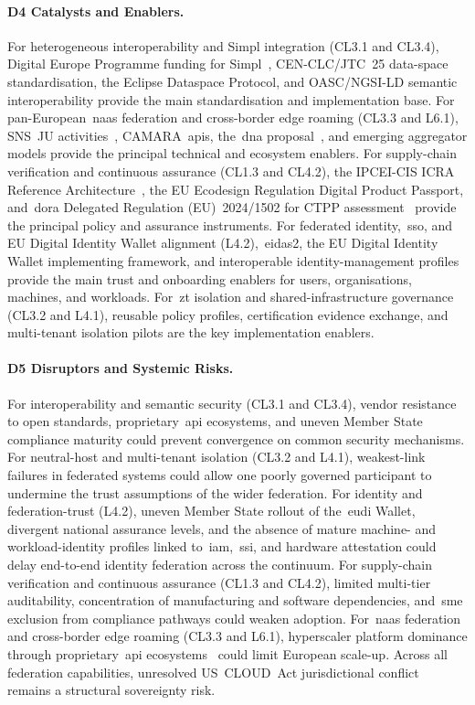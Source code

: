 \documentclass{ieeeaccess}
\begin{document}
\paragraph{D4 Catalysts and Enablers.}
For heterogeneous interoperability and Simpl integration (CL3.1 and CL3.4), Digital Europe Programme funding for Simpl~\cite{ecsimpl}, CEN-CLC/JTC~25 data-space standardisation, the Eclipse Dataspace Protocol, and OASC/NGSI-LD semantic interoperability provide the main standardisation and implementation base. For pan-European~\gls{naas} federation and cross-border edge roaming (CL3.3 and L6.1), SNS~JU activities~\cite{snsju2023}, CAMARA~\glspl{api}, the~\gls{dna} proposal~\cite{eudna2026}, and emerging aggregator models provide the principal technical and ecosystem enablers. For supply-chain verification and continuous assurance (CL1.3 and CL4.2), the IPCEI-CIS ICRA Reference Architecture~\cite{ipceicis2023}, the EU Ecodesign Regulation Digital Product Passport, and~\gls{dora} Delegated Regulation (EU)~2024/1502 for CTPP assessment~\cite{eudora} provide the principal policy and assurance instruments. For federated identity,~\gls{sso}, and EU Digital Identity Wallet alignment (L4.2),~\gls{eidas2}, the EU Digital Identity Wallet implementing framework, and interoperable identity-management profiles provide the main trust and onboarding enablers for users, organisations, machines, and workloads. For~\gls{zt} isolation and shared-infrastructure governance (CL3.2 and L4.1), reusable policy profiles, certification evidence exchange, and multi-tenant isolation pilots are the key implementation enablers.

\paragraph{D5 Disruptors and Systemic Risks.}
For interoperability and semantic security (CL3.1 and CL3.4), vendor resistance to open standards, proprietary~\gls{api} ecosystems, and uneven Member State compliance maturity could prevent convergence on common security mechanisms. For neutral-host and multi-tenant isolation (CL3.2 and L4.1), weakest-link failures in federated systems could allow one poorly governed participant to undermine the trust assumptions of the wider federation. For identity and federation-trust (L4.2), uneven Member State rollout of the~\gls{eudi} Wallet, divergent national assurance levels, and the absence of mature machine- and workload-identity profiles linked to~\gls{iam},~\gls{ssi}, and hardware attestation could delay end-to-end identity federation across the continuum. For supply-chain verification and continuous assurance (CL1.3 and CL4.2), limited multi-tier auditability, concentration of manufacturing and software dependencies, and~\gls{sme} exclusion from compliance pathways could weaken adoption. For~\gls{naas} federation and cross-border edge roaming (CL3.3 and L6.1), hyperscaler platform dominance through proprietary~\gls{api} ecosystems~\cite{synergy2025} could limit European scale-up. Across all federation capabilities, unresolved US~CLOUD~Act jurisdictional conflict~\cite{microsoftsenat2025} remains a structural sovereignty risk.
\end{document}
